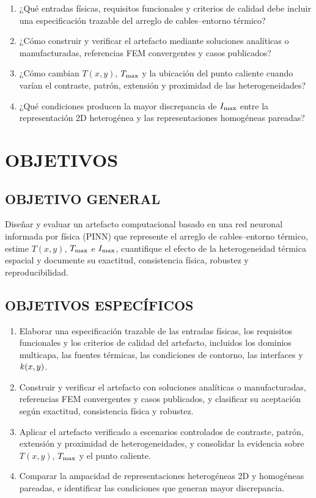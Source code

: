 \begin{enumerate}[label=PE\arabic*.]
  \item ¿Qué entradas físicas, requisitos funcionales y criterios de calidad debe incluir una especificación trazable del arreglo de cables--entorno térmico?
  \item ¿Cómo construir y verificar el artefacto mediante soluciones analíticas o manufacturadas, referencias FEM convergentes y casos publicados?
  \item ¿Cómo cambian $T(x,y)$, $T_{\max}$ y la ubicación del punto caliente cuando varían el contraste, patrón, extensión y proximidad de las heterogeneidades?
  \item ¿Qué condiciones producen la mayor discrepancia de $I_{\max}$ entre la representación 2D heterogénea y las representaciones homogéneas pareadas?
\end{enumerate}

\section{OBJETIVOS}
\label{sec:objetivos}

\subsection{OBJETIVO GENERAL}

Diseñar y evaluar un artefacto computacional basado en una red neuronal informada por física (PINN) que represente el arreglo de cables--entorno térmico, estime $T(x,y)$, $T_{\max}$ e $I_{\max}$, cuantifique el efecto de la heterogeneidad térmica espacial y documente su exactitud, consistencia física, robustez y reproducibilidad.

\subsection{OBJETIVOS ESPECÍFICOS}

\begin{enumerate}[label=OE\arabic*.]
  \item Elaborar una especificación trazable de las entradas físicas, los requisitos funcionales y los criterios de calidad del artefacto, incluidos los dominios multicapa, las fuentes térmicas, las condiciones de contorno, las interfaces y $k(x,y)$.
  \item Construir y verificar el artefacto con soluciones analíticas o manufacturadas, referencias FEM convergentes y casos publicados, y clasificar su aceptación según exactitud, consistencia física y robustez.
  \item Aplicar el artefacto verificado a escenarios controlados de contraste, patrón, extensión y proximidad de heterogeneidades, y consolidar la evidencia sobre $T(x,y)$, $T_{\max}$ y el punto caliente.
  \item Comparar la ampacidad de representaciones heterogéneas 2D y homogéneas pareadas, e identificar las condiciones que generan mayor discrepancia.
\end{enumerate}

